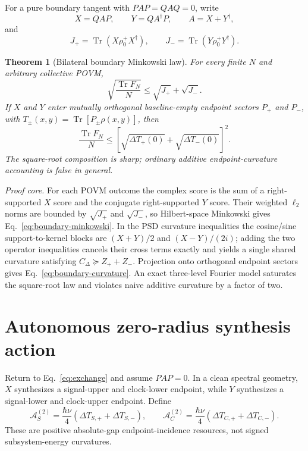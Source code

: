 \documentclass[aps,pra,preprint,nofootinbib]{revtex4-2}
\newtheorem{theorem}{Theorem}
\newcommand{\Tr}{\operatorname{Tr}}
\newcommand{\rhozero}{\rho_0}
\newcommand{\Fcl}{F}
\newcommand{\Aact}{\mathcal A}
\begin{document}
For a pure boundary tangent with $PAP=QAQ=0$, write
\begin{equation}
X=QAP,\qquad Y=QA^\dagger P,\qquad A=X+Y^\dagger,
\end{equation}
and
\begin{equation}
J_+=\Tr(X\rhozero^+X^\dagger),\qquad
J_-=\Tr(Y\rhozero^+Y^\dagger).
\end{equation}

\begin{theorem}[Bilateral boundary Minkowski law]
\label{thm:bilateral-boundary}
For every finite $N$ and arbitrary collective POVM,
\begin{equation}
\boxed{
\sqrt{\frac{\Tr \Fcl_N}{N}}
\le \sqrt{J_+}+\sqrt{J_-}.
}
\label{eq:boundary-minkowski}
\end{equation}
If $X$ and $Y$ enter mutually orthogonal baseline-empty endpoint sectors $P_+$ and $P_-$, with $T_\pm(x,y)=\Tr[P_\pm\rho(x,y)]$, then
\begin{equation}
\boxed{
\frac{\Tr \Fcl_N}{N}
\le
\left[\sqrt{\Delta T_+(0)}+\sqrt{\Delta T_-(0)}\right]^2.
}
\label{eq:boundary-curvature}
\end{equation}
The square-root composition is sharp; ordinary additive endpoint-curvature accounting is false in general.
\end{theorem}

\emph{Proof core.} For each POVM outcome the complex score is the sum of a right-supported $X$ score and the conjugate right-supported $Y$ score. Their weighted $\ell_2$ norms are bounded by $\sqrt{J_+}$ and $\sqrt{J_-}$, so Hilbert-space Minkowski gives Eq.~\eqref{eq:boundary-minkowski}. In the PSD curvature inequalities the cosine/sine support-to-kernel blocks are $(X+Y)/2$ and $(X-Y)/(2i)$; adding the two operator inequalities cancels their cross terms exactly and yields a single shared curvature satisfying $C_\Delta\succeq Z_++Z_-$. Projection onto orthogonal endpoint sectors gives Eq.~\eqref{eq:boundary-curvature}. An exact three-level Fourier model saturates the square-root law and violates naive additive curvature by a factor of two.

\section{Autonomous zero-radius synthesis action}
\label{sec:autonomous-action}

Return to Eq.~\eqref{eq:exchange} and assume $PAP=0$. In a clean spectral geometry, $X$ synthesizes a signal-upper and clock-lower endpoint, while $Y$ synthesizes a signal-lower and clock-upper endpoint. Define
\begin{equation}
\Aact_S^{(2)}=\frac{\hbar\nu}{4}(\Delta T_{S,+}+\Delta T_{S,-}),
\qquad
\Aact_C^{(2)}=\frac{\hbar\nu}{4}(\Delta T_{C,+}+\Delta T_{C,-}).
\label{eq:local-actions}
\end{equation}
These are positive absolute-gap endpoint-incidence resources, not signed subsystem-energy curvatures.
\end{document}
